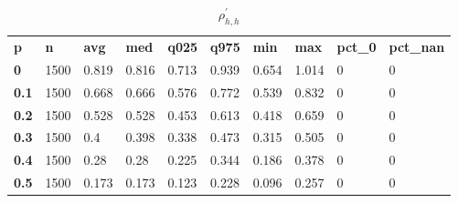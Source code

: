 \begin{table}[h]
 \centering 
\footnotesize
\caption{$\rho_{h,h}^\prime $}
\label{tab:alphahh}
\begin{tabular}[h]{| l l l l l l l l l l|
    } \hline
\textbf{ p} & \textbf{ n} & \textbf{ avg} & \textbf{ med} & \textbf{ q025} & \textbf{ q975} & \textbf{ min} & \textbf{ max} & \textbf{ pct\_0} & \textbf{ pct\_nan}
           \\
  \textbf{  0} & 1500 & 0.819 & 0.816 & 0.713 & 0.939 & 0.654 & 1.014 & 0 & 0
           \\
  \textbf{0.1} & 1500 & 0.668 & 0.666 & 0.576 & 0.772 & 0.539 & 0.832 & 0 & 0
           \\
  \textbf{0.2} & 1500 & 0.528 & 0.528 & 0.453 & 0.613 & 0.418 & 0.659 & 0 & 0
           \\
  \textbf{0.3} & 1500 &   0.4 & 0.398 & 0.338 & 0.473 & 0.315 & 0.505 & 0 & 0
           \\
  \textbf{0.4} & 1500 &  0.28 &  0.28 & 0.225 & 0.344 & 0.186 & 0.378 & 0 & 0
           \\
  \textbf{0.5} & 1500 & 0.173 & 0.173 & 0.123 & 0.228 & 0.096 & 0.257 & 0 & 0
           \\
 \hline \end{tabular}
 \end{table}
